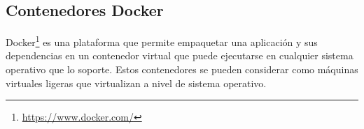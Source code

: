     
    
    
    


\subsection{Contenedores Docker}

Docker\footnote{\url{https://www.docker.com/}} es una plataforma que permite empaquetar una aplicación y sus dependencias en un contenedor virtual que puede ejecutarse en cualquier sistema operativo que lo soporte. Estos contenedores se pueden considerar como máquinas virtuales ligeras que virtualizan a nivel de sistema operativo.

